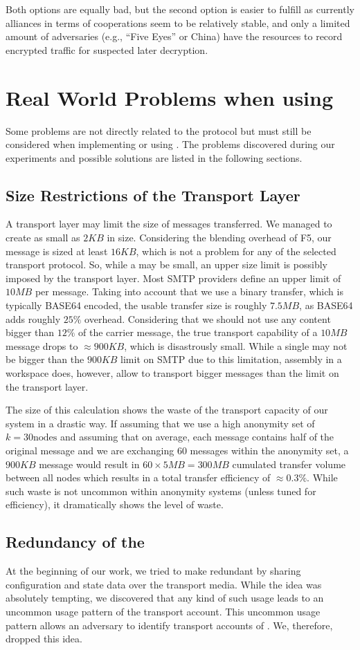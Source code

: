 Both options are equally bad, but the second option is easier to fulfill as currently alliances in terms of cooperations seem to be relatively stable, and only a limited amount of adversaries (e.g., ``Five Eyes'' or China) have the resources to record encrypted traffic for suspected later decryption.

\chapter{Real World Problems when using \MessageVortex}
Some problems are not directly related to the \MessageVortex{} protocol but must still be considered when implementing or using \MessageVortex. The problems discovered during our experiments and possible solutions are listed in the following sections.

\section{Size Restrictions of the Transport Layer}
A transport layer may limit the size of messages transferred. We managed to create \VortexMessages{} as small as $2KB$ in size. Considering the blending overhead of F5, our message is sized at least $16KB$, which is not a problem for any of the selected transport protocol. So, while a \VortexMessage{} may be small, an upper size limit is possibly imposed by the transport layer. Most SMTP providers define an upper limit of $10MB$ per message. Taking into account that we use a binary transfer, which is typically BASE64 encoded, the usable transfer size is roughly $7.5MB$, as BASE64 adds roughly $25\%$ overhead. Considering that we should not use any content bigger than $12\%$ of the carrier message, the true transport capability of a $10MB$ message drops to $\approx 900KB$, which is disastrously small. While a single \VortexMessage may not be bigger than the $900KB$ limit on SMTP due to this limitation, assembly in a workspace does, however, allow to transport bigger messages than the limit on the transport layer.

The size of this calculation shows the waste of the transport capacity of our system in a drastic way. If assuming that we use a high anonymity set of $k=30 \text{nodes}$ and assuming that on average, each message contains half of the original message and we are exchanging 60 messages within the anonymity set, a $900KB$ message would result in $60\times 5MB=300MB$ cumulated transfer volume between all nodes which results in a total transfer efficiency of $\approx 0.3\%$. While such waste is not uncommon within anonymity systems (unless tuned for efficiency), it dramatically shows the level of waste.

\section{Redundancy of the \VortexNode}
At the beginning of our work, we tried to make \VortexNodes redundant by sharing configuration and state data over the transport media. While the idea was absolutely tempting, we discovered that any kind of such usage leads to an uncommon usage pattern of the transport account. This uncommon usage pattern allows an adversary to identify transport accounts of \VortexNodes. We, therefore, dropped this idea. 